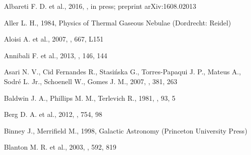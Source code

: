 \begin{thebibliography}{}



 Albareti F. D. et al., 2016, \apjs, in press; preprint arXiv:1608.02013

 Aller L. H., 1984, Physics of Thermal
Gaseous Nebulae (Dordrecht: Reidel)

 Aloisi A. et al., 2007, \apj, 667, L151


 Annibali F. et al., 2013, \aj, 146, 144

 Asari N. V., Cid Fernandes R., 
Stasi\'nska G., Torres-Papaqui J. P., Mateus A., Sodr\'e L. Jr., 
Schoenell W., Gomes J. M., 2007, \mnras, 381, 263

Baldwin J. A., Phillips M. M., Terlevich R., 1981, \pasp, 93, 5




 Berg D. A. et al., 2012, \apj, 754, 98

 Binney J., Merrifield M., 1998, 
Galactic Astronomy (Princeton University Press)

 Blanton M. R. et al., 2003, \apj, 592, 819 %




\end{thebibliography}
